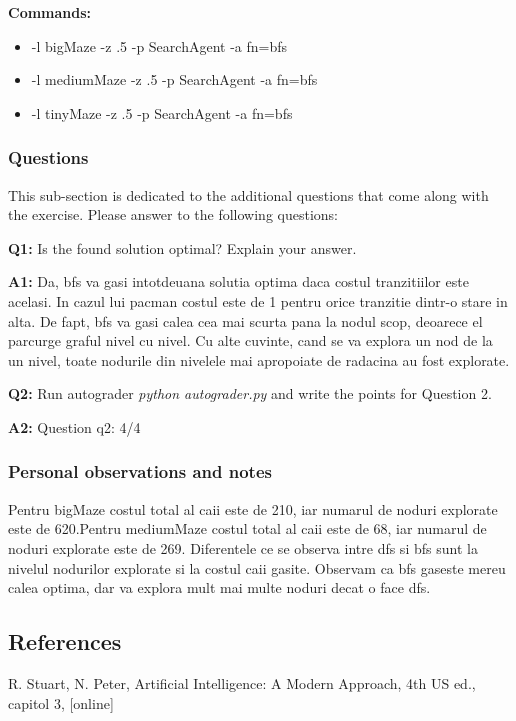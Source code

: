 \textbf{Commands:}
\begin{itemize}
    \setlength\itemsep{0em}
    \item  -l bigMaze -z .5 -p  SearchAgent -a fn=bfs
    \item  -l mediumMaze -z .5 -p  SearchAgent -a fn=bfs
    \item  -l tinyMaze -z .5 -p  SearchAgent -a fn=bfs
        
\end{itemize}

\subsubsection{Questions}
This sub-section is dedicated to the additional questions that come along with the exercise. Please answer to the following questions:\newline


\textbf{Q1:} Is the found solution optimal? Explain your answer. 


\textbf{A1:} Da, bfs va gasi intotdeuana solutia optima daca costul tranzitiilor este acelasi. In cazul lui pacman costul este de 1 pentru orice tranzitie dintr-o stare in alta. De fapt, bfs va gasi calea cea mai scurta pana la nodul scop, deoarece el parcurge graful nivel cu nivel. Cu alte cuvinte, cand se va explora un nod de la un nivel, toate nodurile din nivelele mai apropoiate de radacina au fost explorate. 


\textbf{Q2:} Run autograder \textit{python autograder.py} and write the points for Question 2.


\textbf{A2:} Question q2: 4/4


\subsubsection{Personal observations and notes}
Pentru bigMaze costul total al caii este de 210, iar numarul de noduri explorate este de 620.Pentru mediumMaze costul total al caii este de 68, iar numarul de noduri explorate este de 269. Diferentele ce se observa intre dfs si bfs sunt la nivelul nodurilor explorate si la costul caii gasite. Observam ca bfs gaseste mereu calea optima, dar va explora mult mai multe noduri decat o face dfs.

\vspace{0.75cm}



\subsection{References}
R. Stuart, N. Peter, Artificial Intelligence: A Modern Approach, 4th US ed., capitol 3, [online]